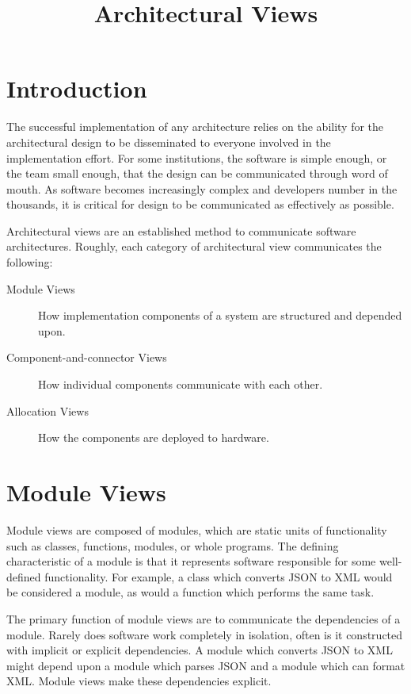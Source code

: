 \title{Architectural Views}
\maketitle

\section{Introduction}

The successful implementation of any architecture relies on the ability for the architectural design
to be disseminated to everyone involved in the implementation effort.
For some institutions, the software is simple enough, or the team small enough, that the design
can be communicated through word of mouth.
As software becomes increasingly complex and developers number in the thousands,
it is critical for design to be communicated as effectively as possible.

Architectural views are an established method to communicate software architectures.
Roughly, each category of architectural view communicates the following:
\begin{description}
    \item[Module Views] How implementation components of a system are structured and depended upon.
    \item[Component-and-connector Views] How individual components communicate with each other.
    \item[Allocation Views] How the components are deployed to hardware.
\end{description}

\section{Module Views}
Module views are composed of modules, which are static units of functionality such as classes, functions, modules, or whole programs.
The defining characteristic of a module is that it represents software responsible for some well-defined functionality.
For example, a class which converts JSON to XML would be considered a module, as would a function which performs the same task.

The primary function of module views are to communicate the dependencies of a module.
Rarely does software work completely in isolation, often is it constructed with implicit or explicit dependencies.
A module which converts JSON to XML might depend upon a module which parses JSON and a module which can format XML.
Module views make these dependencies explicit.

